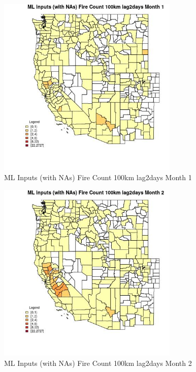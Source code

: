 \clearpage 

\begin{figure} 
\centering  
\includegraphics[width=0.77\textwidth]{Code_Outputs/Report_ML_input_PM25_Step4_part_f_de_duplicated_aves_prioritize_24hr_obswNAs_CountyFire_Count_100km_lag2daysmedianMonth1.jpg} 
\caption{\label{fig:Report_ML_input_PM25_Step4_part_f_de_duplicated_aves_prioritize_24hr_obswNAsCountyFire_Count_100km_lag2daysmedianMonth1}ML Inputs (with NAs) Fire Count 100km lag2days Month 1} 
\end{figure} 
 

\begin{figure} 
\centering  
\includegraphics[width=0.77\textwidth]{Code_Outputs/Report_ML_input_PM25_Step4_part_f_de_duplicated_aves_prioritize_24hr_obswNAs_CountyFire_Count_100km_lag2daysmedianMonth2.jpg} 
\caption{\label{fig:Report_ML_input_PM25_Step4_part_f_de_duplicated_aves_prioritize_24hr_obswNAsCountyFire_Count_100km_lag2daysmedianMonth2}ML Inputs (with NAs) Fire Count 100km lag2days Month 2} 
\end{figure} 
 

